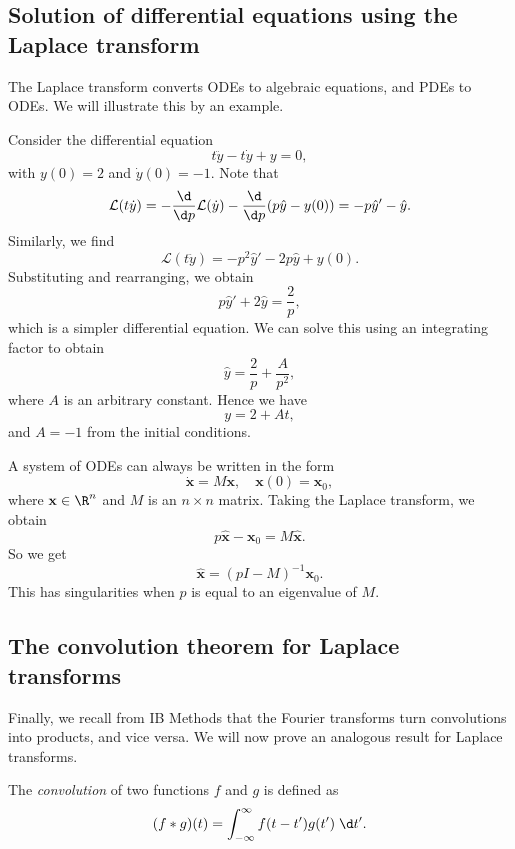 \documentclass[a4paper]{article}
\begin{document}
\subsection{Solution of differential equations using the Laplace transform}
The Laplace transform converts ODEs to algebraic equations, and PDEs to ODEs. We will illustrate this by an example.

\begin{eg}
  Consider the differential equation
  \[
    t\ddot{y} - t\dot{y} + y = 0,
  \]
  with $y(0) = 2$ and $\dot{y}(0) = -1$. Note that
  \[
    \mathcal{L}(t \dot{y}) = -\frac{\d}{\d p} \mathcal{L}(\dot{y}) - \frac{\d}{\d p} (p\hat{y} - y(0)) = -p\hat{y}' - \hat{y}.
  \]
  Similarly, we find
  \[
    \mathcal{L}(t\ddot{y}) = -p^2 \hat{y}' - 2p \hat{y} + y(0).
  \]
  Substituting and rearranging, we obtain
  \[
    p \hat{y}' + 2\hat{y} = \frac{2}{p},
  \]
  which is a simpler differential equation. We can solve this using an integrating factor to obtain
  \[
    \hat{y} = \frac{2}{p} + \frac{A}{p^2},
  \]
  where $A$ is an arbitrary constant. Hence we have
  \[
    y = 2 + At,
  \]
  and $A = -1$ from the initial conditions.
\end{eg}

\begin{eg}
  A system of ODEs can always be written in the form
  \[
    \dot{\mathbf{x}} = M \mathbf{x},\quad \mathbf{x}(0) = \mathbf{x}_0,
  \]
  where $\mathbf{x} \in \R^n$ and $M$ is an $n \times n$ matrix. Taking the Laplace transform, we obtain
  \[
    p \hat{\mathbf{x}} - \mathbf{x}_0 = M \hat{\mathbf{x}}.
  \]
  So we get
  \[
    \hat{\mathbf{x}} = (pI - M)^{-1} \mathbf{x}_0.
  \]
  This has singularities when $p$ is equal to an eigenvalue of $M$.
\end{eg}

\subsection{The convolution theorem for Laplace transforms}
Finally, we recall from IB Methods that the Fourier transforms turn convolutions into products, and vice versa. We will now prove an analogous result for Laplace transforms.

\begin{defi}[Convolution]
  The \emph{convolution} of two functions $f$ and $g$ is defined as
  \[
    (f * g)(t) = \int_{-\infty}^\infty f(t - t') g(t') \;\d t'.
  \]
\end{defi}
\end{document}
